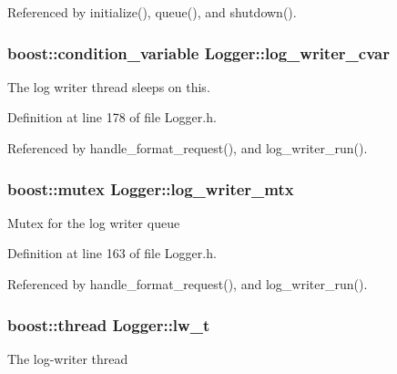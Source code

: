 Referenced by initialize(), queue(), and shutdown().

\hypertarget{classLogger_afbd56cc7017de01fc22be29f641be63a}{
\subsubsection[{log\_\-writer\_\-cvar}]{\setlength{\rightskip}{0pt plus 5cm}boost::condition\_\-variable {\bf Logger::log\_\-writer\_\-cvar}}}
\label{classLogger_afbd56cc7017de01fc22be29f641be63a}
The log writer thread sleeps on this. 

Definition at line 178 of file Logger.h.



Referenced by handle\_\-format\_\-request(), and log\_\-writer\_\-run().

\hypertarget{classLogger_a2c4c569c9b4e1d3161979e4d60545024}{
\subsubsection[{log\_\-writer\_\-mtx}]{\setlength{\rightskip}{0pt plus 5cm}boost::mutex {\bf Logger::log\_\-writer\_\-mtx}}}
\label{classLogger_a2c4c569c9b4e1d3161979e4d60545024}
Mutex for the log writer queue 

Definition at line 163 of file Logger.h.



Referenced by handle\_\-format\_\-request(), and log\_\-writer\_\-run().

\hypertarget{classLogger_a6214da297e928d0c9f960a249b6fcf8c}{
\subsubsection[{lw\_\-t}]{\setlength{\rightskip}{0pt plus 5cm}boost::thread {\bf Logger::lw\_\-t}}}
\label{classLogger_a6214da297e928d0c9f960a249b6fcf8c}
The log-\/writer thread 

